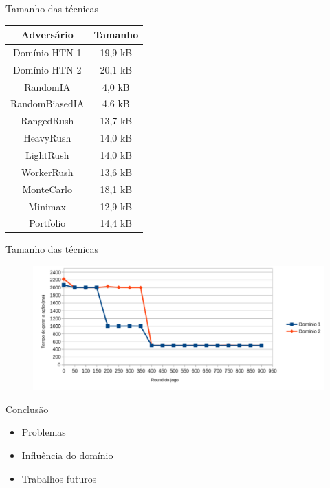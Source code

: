 \documentclass{beamer}
\begin{document}
\begin{frame}{Tamanho das técnicas}
	
	{\footnotesize
		\begin{center}
			\begin{tabular}{|c|c|}
				\hline
				\textbf{Adversário}     & \textbf{Tamanho} \\ \hline
				Domínio HTN 1           & 19,9 kB          \\ \hline
				Domínio HTN 2           & 20,1 kB          \\ \hline
				RandomIA                & 4,0 kB           \\ \hline
				RandomBiasedIA          & 4,6 kB           \\ \hline
				RangedRush              & 13,7 kB          \\ \hline
				HeavyRush               & 14,0 kB          \\ \hline
				LightRush               & 14,0 kB          \\ \hline
				WorkerRush              & 13,6 kB          \\ \hline
				MonteCarlo              & 18,1 kB          \\ \hline
				Minimax                 & 12,9 kB          \\ \hline
				Portfolio               & 14,4 kB          \\ \hline
			\end{tabular}
		\end{center}
	}
\end{frame}
\begin{frame}{Tamanho das técnicas}
	\begin{figure}[here]
		\includegraphics[width=0.9\linewidth]{fig/graph.pdf}
	\end{figure}
\end{frame}

\begin{frame}{Conclusão}
	\begin{itemize}
		\item Problemas
		\item Influência do domínio
		\item Trabalhos futuros
	\end{itemize}
\end{frame}

\end{document}
